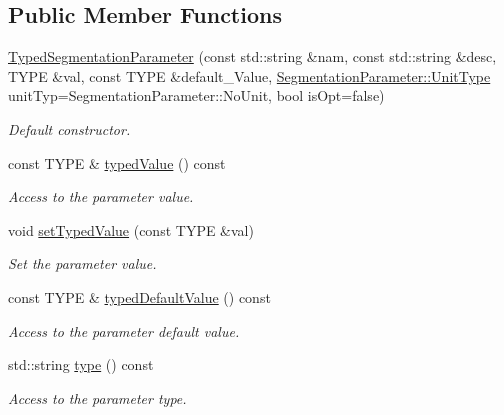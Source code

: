 \subsection*{Public Member Functions}
\begin{DoxyCompactItemize}
\item 
\hyperlink{class_d_d4hep_1_1_d_d_segmentation_1_1_typed_segmentation_parameter_a59c2507c03ce750d64a5800bdc0f531b}{TypedSegmentationParameter} (const std::string \&nam, const std::string \&desc, TYPE \&val, const TYPE \&default\_\-Value, \hyperlink{class_d_d4hep_1_1_d_d_segmentation_1_1_segmentation_parameter_a36f5f8b8d812b2a2b81363377565d8d4}{SegmentationParameter::UnitType} unitTyp=SegmentationParameter::NoUnit, bool isOpt=false)
\begin{DoxyCompactList}\small\item\em Default constructor. \item\end{DoxyCompactList}\item 
const TYPE \& \hyperlink{class_d_d4hep_1_1_d_d_segmentation_1_1_typed_segmentation_parameter_abf712bbc2120c2614f7c07124b629c4c}{typedValue} () const 
\begin{DoxyCompactList}\small\item\em Access to the parameter value. \item\end{DoxyCompactList}\item 
void \hyperlink{class_d_d4hep_1_1_d_d_segmentation_1_1_typed_segmentation_parameter_a53509da19e4377e01d2fdb685f94778a}{setTypedValue} (const TYPE \&val)
\begin{DoxyCompactList}\small\item\em Set the parameter value. \item\end{DoxyCompactList}\item 
const TYPE \& \hyperlink{class_d_d4hep_1_1_d_d_segmentation_1_1_typed_segmentation_parameter_aeb4b1afa4fd34ae8d3c7e5d1089e51c7}{typedDefaultValue} () const 
\begin{DoxyCompactList}\small\item\em Access to the parameter default value. \item\end{DoxyCompactList}\item 
std::string \hyperlink{class_d_d4hep_1_1_d_d_segmentation_1_1_typed_segmentation_parameter_a69e362f7662d675f97abf3c12233721d}{type} () const 
\begin{DoxyCompactList}\small\item\em Access to the parameter type. \item\end{DoxyCompactList}\item 

\end{DoxyCompactItemize}
